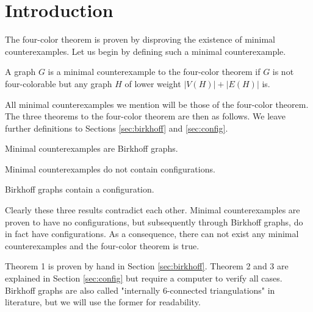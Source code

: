 \section{Introduction}

The four-color theorem is proven by disproving the existence of minimal counterexamples. Let us begin by defining such a minimal counterexample.
\begin{definition}
A graph $G$ is a minimal counterexample to the four-color theorem if $G$ is not four-colorable but any graph $H$ of lower weight $|V(H)|+|E(H)|$ is.
\end{definition}

All minimal counterexamples we mention will be those of the four-color theorem.
The three theorems to the four-color theorem are then as follows. We leave further definitions to Sections \ref{sec:birkhoff} and \ref{sec:config}.

\begin{theorem}
Minimal counterexamples are Birkhoff graphs.
\end{theorem}

\begin{theorem}
Minimal counterexamples do not contain configurations.
\end{theorem}

\begin{theorem}
Birkhoff graphs contain a configuration.
\end{theorem}

Clearly these three results contradict each other. Minimal counterexamples are proven to have no configurations, but subsequently through Birkhoff graphs, do in fact have configurations. As a consequence, there can not exist any minimal counterexamples and the four-color theorem is true. 

Theorem 1 is proven by hand in Section \ref{sec:birkhoff}. Theorem 2 and 3 are explained in Section \ref{sec:config} but require a computer to verify all cases. Birkhoff graphs are also called "internally 6-connected triangulations" in literature, but we will use the former for readability.
